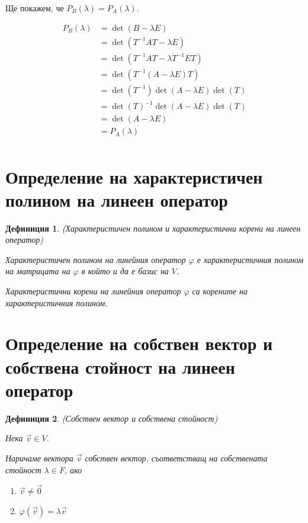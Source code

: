 \documentclass{scrartcl}
\newtheorem{definition}{Дефиниция}
\begin{document}
\begin{FlushLeft}
Ще покажем, че $P_B(\lambda) = P_A(\lambda)$.

\begin{align*}
P_B(\lambda)
&= \det(B - \lambda E)\\
&= \det(T^{-1}AT - \lambda E)\\
&= \det(T^{-1}AT - \lambda T^{-1} ET)\\
&= \det(T^{-1}(A - \lambda E)T)\\
&= \det(T^{-1})\det(A - \lambda E)\det(T)\\
&= \det(T)^{-1}\det(A - \lambda E)\det(T)\\
&= \det(A - \lambda E)\\
&= P_A(\lambda)\\
\end{align*}

\section{Определение на характеристичен полином на линеен оператор}

\begin{definition}
(Характеристичен полином и характеристични корени на линеен оператор)

Характеристичен полином на линейния оператор $\varphi$ е характеристичния полином на матрицата на $\varphi$ в който и да е базис на $V$.

Характеристични корени на линейния оператор $\varphi$ са корените на характеристичния полином.
\end{definition}

\section{Определение на
собствен вектор и собствена стойност на линеен оператор}

\begin{definition}
(Собствен вектор и собствена стойност)

Нека $\vec{v}\in V$.

Наричаме вектора $\vec{v}$ собствен вектор, съответстващ на собствената стойност $\lambda \in F$, ако

\begin{enumerate}
    \item $\vec{v} \ne \vec{0}$
    \item $\varphi(\vec{v}) = \lambda \vec{v}$
\end{enumerate}
\end{definition}


\end{FlushLeft}
\end{document}
